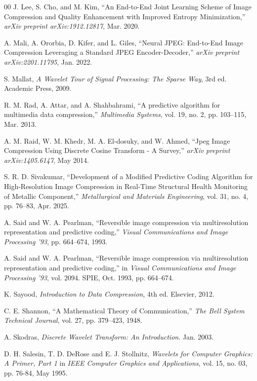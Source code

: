 \begin{thebibliography}{00}
J. Lee, S. Cho, and M. Kim, ``An End-to-End Joint Learning Scheme of Image Compression and Quality Enhancement with Improved Entropy Minimization,'' \emph{arXiv preprint arXiv:1912.12817}, Mar. 2020.

A. Mali, A. Ororbia, D. Kifer, and L. Giles, ``Neural JPEG: End-to-End Image Compression Leveraging a Standard JPEG Encoder-Decoder,'' \emph{arXiv preprint arXiv:2201.11795}, Jan. 2022.

S. Mallat, \emph{A Wavelet Tour of Signal Processing: The Sparse Way}, 3rd ed. Academic Press, 2009.

R. M. Rad, A. Attar, and A. Shahbahrami, ``A predictive algorithm for multimedia data compression,'' \emph{Multimedia Systems}, vol. 19, no. 2, pp. 103--115, Mar. 2013.

A. M. Raid, W. M. Khedr, M. A. El-dosuky, and W. Ahmed, ``Jpeg Image Compression Using Discrete Cosine Transform - A Survey,'' \emph{arXiv preprint arXiv:1405.6147}, May 2014.

S. R. D. Sivakumar, ``Development of a Modified Predictive Coding Algorithm for High-Resolution Image Compression in Real-Time Structural Health Monitoring of Metallic Component,'' \emph{Metallurgical and Materials Engineering}, vol. 31, no. 4, pp. 76--83, Apr. 2025.

A. Said and W. A. Pearlman, ``Reversible image compression via multiresolution representation and predictive coding,'' \emph{Visual Communications and Image Processing '93}, pp. 664--674, 1993.

A. Said and W. A. Pearlman, ``Reversible image compression via multiresolution representation and predictive coding,'' in \emph{Visual Communications and Image Processing '93}, vol. 2094. SPIE, Oct. 1993, pp. 664--674.

K. Sayood, \emph{Introduction to Data Compression}, 4th ed. Elsevier, 2012.

C. E. Shannon, ``A Mathematical Theory of Communication,'' \emph{The Bell System Technical Journal}, vol. 27, pp. 379--423, 1948.

A. Skodras, \emph{Discrete Wavelet Transform: An Introduction}. Jan. 2003.

D. H. Salesin, T. D. DeRose and E. J. Stollnitz, \emph{Wavelets for Computer Graphics: A Primer, Part 1} in \emph{IEEE Computer Graphics and Applications}, vol. 15, no. 03, pp. 76-84, May 1995.


\end{thebibliography}
